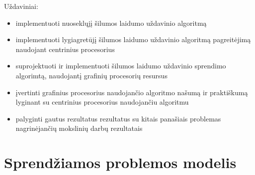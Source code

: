 \documentclass{VUMIFPSbakalaurinis}
\begin{document}



Uždaviniai:
\begin{itemize}
    \item implementuoti nuoseklųjį šilumos laidumo uždavinio algoritmą
    \item implementuoti lygiagretūjį šilumos laidumo uždavinio algoritmą pagreitėjimą naudojant centrinius procesorius
    \item suprojektuoti ir implementuoti šilumos laidumo uždavinio sprendimo algorimtą, naudojantį grafinių procesorių resursus
    \item įvertinti grafinius procesorius naudojančio algoritmo našumą ir praktiškumą lyginant su centrinius procesorius naudojančiu algoritmu
    \item palyginti gautus rezultatus rezultatus su kitais panašiais problemas nagrinėjančių mokslinių darbų rezultatais
\end{itemize}



\section{Sprendžiamos problemos modelis}
\end{document}
